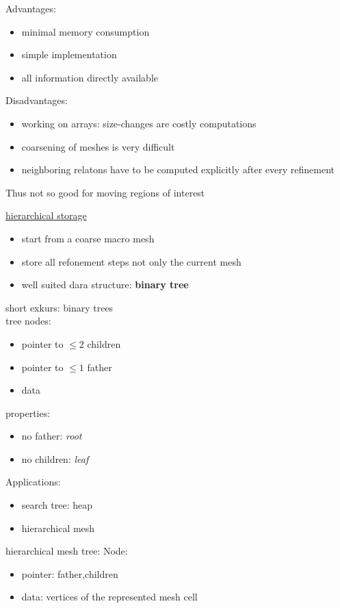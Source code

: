 Advantages:
\begin{itemize}
	\item minimal memory consumption
	\item simple implementation
	\item all information directly available
\end{itemize}

Disadvantages:
\begin{itemize}
	\item working on arrays: size-changes are costly computations
	\item coarsening of meshes is very difficult
	\item neighboring relatons have to be computed explicitly after every refinement
\end{itemize}
Thus not so good for moving regions of interest

\underline{hierarchical storage}\\
\begin{itemize}
	\item start from a coarse \glqq macro mesh \grqq
	\item store all refonement steps not only the current mesh
	\item well suited dara structure: \textbf{binary tree}
\end{itemize}

short exkurs: binary trees\\
tree nodes:
\begin{itemize}
	\item pointer to $\leq 2$ children
	\item pointer to $\leq 1$ father
	\item data
\end{itemize}
properties:
\begin{itemize}
	\item no father: \textit{root}
	\item no children: \textit{leaf}
\end{itemize}

Applications:
\begin{itemize}
	\item search tree: heap
	\item hierarchical mesh
\end{itemize}

hierarchical mesh tree:
Node:
\begin{itemize}
	\item pointer: father,children
	\item data: vertices of the represented mesh cell
\end{itemize}


